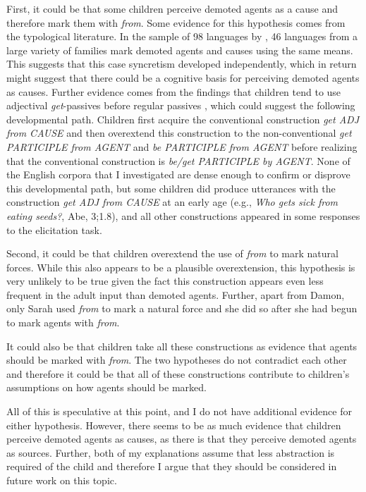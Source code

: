 \documentclass[lucida]{sp} %
\begin{document}
First, it could be that some children perceive demoted agents as a cause and therefore mark them with \textit{from}. Some evidence for this hypothesis comes from the typological literature. In the sample of 98 languages by \cite{palancar2002}, 46 languages from a large variety of families mark demoted agents and causes using the same means. This suggests that this case syncretism developed independently, which in return might suggest that there could be  a cognitive basis for perceiving demoted agents as causes. 
 Further evidence comes from the findings that children tend to use adjectival \textit{get}-passives before regular passives \citep{borer1987,fox1998}, which could suggest the following developmental path. Children first acquire the conventional construction \textit{get ADJ from CAUSE} and then overextend this construction to the non-conventional \textit{get PARTICIPLE from AGENT} and \textit{be PARTICIPLE from AGENT} before realizing that the conventional construction is \textit{be/get PARTICIPLE by AGENT}. None of the English corpora that I investigated are dense enough to confirm or disprove this developmental path, but some children did produce utterances with the construction \textit{get ADJ from CAUSE} at an early age (e.g., \textit{Who gets sick from eating seeds?}, Abe, 3;1.8), and all other constructions appeared in some responses to the elicitation task.

Second, it could be that children overextend the use of \textit{from} to mark natural forces. While this also appears to be a plausible overextension, this hypothesis is very unlikely to be true given the fact this construction appears even less frequent in the adult input than demoted agents. Further, apart from Damon, only Sarah used \textit{from} to mark a natural force and she did so after she had begun to mark agents with \textit{from}.

It could also be that children take all these constructions as evidence that agents should be marked with \textit{from}. The two hypotheses do not contradict each other and therefore it could be that all of these constructions contribute to children's assumptions on how agents should be marked.  

All of this is speculative at this point, and I do not have additional evidence for either hypothesis. However, there seems to be as much evidence that children perceive demoted agents as causes, as there is that they perceive demoted agents as sources. Further, both of my explanations assume that less abstraction is required of the child and therefore I argue that they should be considered in future work on this topic.
\end{document}
